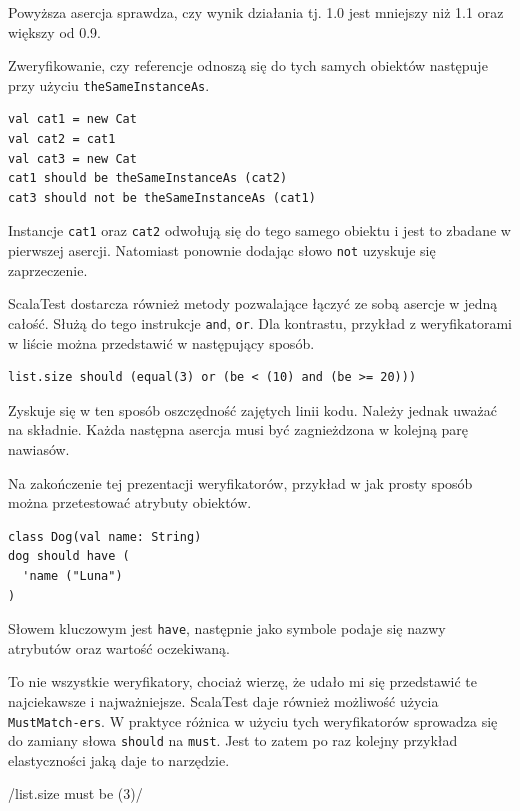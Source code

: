 \documentclass[wimgr]{xmgr}
\begin{document}
Powyższa asercja sprawdza, czy wynik działania tj. 1.0 jest mniejszy niż 1.1 oraz większy od 0.9.

Zweryfikowanie, czy referencje odnoszą się do tych samych obiektów następuje przy użyciu \texttt{theSameInstanceAs}.

\begin{verbatim}
val cat1 = new Cat
val cat2 = cat1
val cat3 = new Cat	
cat1 should be theSameInstanceAs (cat2)
cat3 should not be theSameInstanceAs (cat1)
\end{verbatim}

Instancje \texttt{cat1} oraz \texttt{cat2} odwołują się do tego samego obiektu i jest to zbadane w pierwszej asercji. Natomiast ponownie dodając słowo \texttt{not} uzyskuje się zaprzeczenie.

ScalaTest dostarcza również metody pozwalające łączyć ze sobą asercje w jedną całość. Służą do tego instrukcje \texttt{and}, \texttt{or}. Dla kontrastu, przykład z weryfikatorami w liście można przedstawić w następujący sposób.

\begin{verbatim}
list.size should (equal(3) or (be < (10) and (be >= 20)))
\end{verbatim}

Zyskuje się w ten sposób oszczędność zajętych linii kodu. Należy jednak uważać na składnie. Każda następna asercja musi być zagnieżdzona w kolejną parę nawiasów.

Na zakończenie tej prezentacji weryfikatorów, przykład w jak prosty sposób można przetestować atrybuty obiektów.

\begin{verbatim}
class Dog(val name: String)
dog should have (
  'name ("Luna")
)
\end{verbatim}

Słowem kluczowym jest \texttt{have}, następnie jako symbole podaje się nazwy atrybutów oraz wartość oczekiwaną.

To nie wszystkie weryfikatory, chociaż wierzę, że udało mi się przedstawić te najciekawsze i najważniejsze. ScalaTest daje również możliwość użycia \texttt{MustMatch-\newline ers}. W praktyce różnica w użyciu tych weryfikatorów sprowadza się do zamiany słowa \texttt{should} na \texttt{must}. Jest to zatem po raz kolejny przykład elastyczności jaką daje to narzędzie.

/list.size must be (3)/ 
\end{document}
